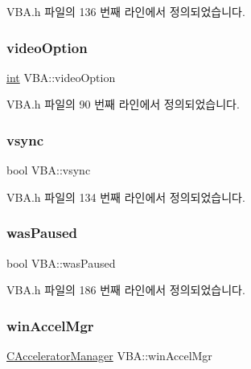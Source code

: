 V\+B\+A.\+h 파일의 136 번째 라인에서 정의되었습니다.

\mbox{\label{class_v_b_a_a17dac073149c897f770c00ed7098ad32}} 
\subsubsection{\texorpdfstring{video\+Option}{videoOption}}
{\footnotesize\ttfamily \mbox{\hyperlink{_util_8cpp_a0ef32aa8672df19503a49fab2d0c8071}{int}} V\+B\+A\+::video\+Option}



V\+B\+A.\+h 파일의 90 번째 라인에서 정의되었습니다.

\mbox{\label{class_v_b_a_a84075b77df64f3dc2100159064b79fba}} 
\subsubsection{\texorpdfstring{vsync}{vsync}}
{\footnotesize\ttfamily bool V\+B\+A\+::vsync}



V\+B\+A.\+h 파일의 134 번째 라인에서 정의되었습니다.

\mbox{\label{class_v_b_a_a3c2e2ea8cb921007fcf2764da22c06e0}} 
\subsubsection{\texorpdfstring{was\+Paused}{wasPaused}}
{\footnotesize\ttfamily bool V\+B\+A\+::was\+Paused}



V\+B\+A.\+h 파일의 186 번째 라인에서 정의되었습니다.

\mbox{\label{class_v_b_a_ad7ebce057dbde0ca88cee75e84721a89}} 
\subsubsection{\texorpdfstring{win\+Accel\+Mgr}{winAccelMgr}}
{\footnotesize\ttfamily \mbox{\hyperlink{class_c_accelerator_manager}{C\+Accelerator\+Manager}} V\+B\+A\+::win\+Accel\+Mgr}



